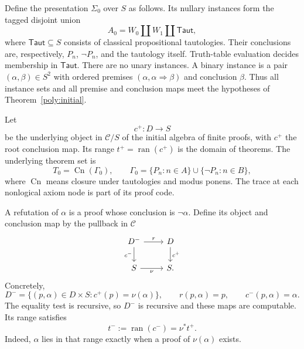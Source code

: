 \documentclass[11pt]{article}
\theoremstyle{definition}
\theoremstyle{remark}
\newcommand{\ran}{\operatorname{ran}}
\begin{document}
Define the presentation $\Sigma_0$ over $S$ as follows. Its nullary
instances form the tagged disjoint union
\[
 A_0=W_0\amalg W_1\amalg\mathsf{Taut},
\]
where $\mathsf{Taut}\subseteq S$ consists of classical propositional
tautologies. Their conclusions are, respectively, $P_n$, $\neg P_n$,
and the tautology itself. Truth-table evaluation decides membership in
$\mathsf{Taut}$. There are no unary instances. A binary instance is a
pair $(\alpha,\beta)\in S^2$ with ordered premises
$(\alpha,\alpha\Rightarrow\beta)$ and conclusion $\beta$.
Thus all instance sets and all premise and conclusion maps meet the
hypotheses of Theorem~\ref{poly:initial}.

Let
\[
 c^+:D\longrightarrow S
\]
be the underlying object in $\mathscr C/S$ of the initial algebra of
finite proofs, with $c^+$ the root conclusion map. Its range
$t^+=\ran(c^+)$ is the domain of theorems.
The underlying theorem set is
\begin{equation}\label{num:axioms}
 T_0=\operatorname{Cn}(\Gamma_0),\qquad
 \Gamma_0=\{P_n:n\in A\}\cup\{\neg P_n:n\in B\},
\end{equation}
where $\operatorname{Cn}$ means closure under tautologies and modus
ponens. The trace at each nonlogical axiom node is part of its proof code.

A refutation of $\alpha$ is a proof whose conclusion is $\neg\alpha$.
Define its object and conclusion map by the pullback in $\mathscr C$
\[
\begin{tikzcd}
 D^- \arrow[r,"r"] \arrow[d,"c^-"'] & D \arrow[d,"c^+"]\\
 S \arrow[r,"\nu"'] & S.
\end{tikzcd}
\]
Concretely,
\[
 D^-=\{(p,\alpha)\in D\times S:c^+(p)=\nu(\alpha)\},\qquad
 r(p,\alpha)=p,\qquad c^-(p,\alpha)=\alpha.
\]
The equality test is recursive, so $D^-$ is recursive and these maps are
computable. Its range satisfies
\begin{equation}\label{num:refutation-range}
 t^-:=\ran(c^-)=\nu^*t^+.
\end{equation}
Indeed, $\alpha$ lies in that range exactly when a proof of
$\nu(\alpha)$ exists.
\end{document}
